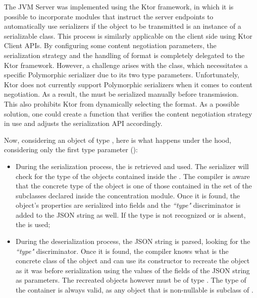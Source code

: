 \begin{warn}
	The JVM Server was implemented using the Ktor framework, in which it is possible to incorporate modules that instruct the server endpoints to automatically use serializers if the object to be transmitted is an instance of a serializable class. This process is similarly applicable on the client side using Ktor Client APIs.
	By configuring some content negotiation parameters, the serialization strategy and the handling of format is completely delegated to the Ktor framework. However, a challenge arises with the  class, which necessitates a specific Polymorphic serializer due to its two type parameters. Unfortunately, Ktor does not currently support Polymorphic serializers when it comes to content negotiation. As a result, the  must be serialized manually before transmission. This also prohibits Ktor from dynamically selecting the format. As a possible solution, one could create a function that verifies the content negotiation strategy in use and adjusts the  serialization API accordingly.
\end{warn}



Now, considering an object of type , here is what happens under the hood, considering only the first type parameter ():
\begin{itemize}
	\item During the serialization process, the   is retrieved and used. The serializer will check for the type of the  objects contained inside the . The compiler is aware that the concrete type of the object is one of those contained in the set of the subclasses declared inside the concentration module. Once it is found, the object's properties are serialized into fields and the \textit{``type"} discriminator is added to the JSON string as well. If the type is not recognized or is absent, the  is used;
	\item  During the deserialization process, the JSON string is parsed, looking for the \textit{``type"} discriminator. Once it is found, the compiler knows what is the concrete class of the object and can use its constructor to recreate the object as it was before serialization using the values of the fields of the JSON string as parameters. The recreated objects however must be of type . The type of the container is always valid, as any object that is non-nullable is subclass of .
\end{itemize}

